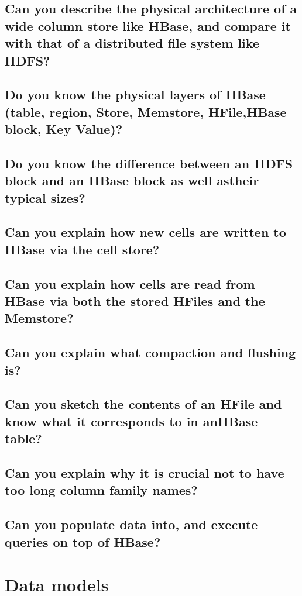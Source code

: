 \documentclass{article}
\begin{document}
\subsection{Can you describe the physical architecture of a wide column store like HBase, and compare it with that of a distributed file system like HDFS?}
\subsection{Do you know the physical layers of HBase (table, region, Store, Memstore, HFile,HBase block, Key Value)?}
\subsection{Do you know the difference between an HDFS block and an HBase block as well astheir typical sizes?}
\subsection{Can you explain how new cells are written to HBase via the cell store?}
\subsection{Can you explain how cells are read from HBase via both the stored HFiles and the Memstore?}
\subsection{Can you explain what compaction and flushing is?}
\subsection{Can you sketch the contents of an HFile and know what it corresponds to in anHBase table?}
\subsection{Can you explain why it is crucial not to have too long column family names?}
\subsection{Can you populate data into, and execute queries on top of HBase?}

\pagebreak

\section{Data models}
\end{document}
